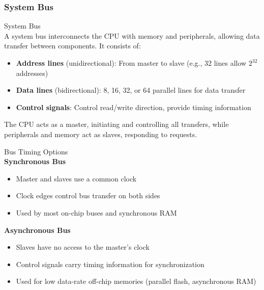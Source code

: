 \subsubsection{System Bus}

\begin{concept}{System Bus}\\
A system bus interconnects the CPU with memory and peripherals, allowing data transfer between components. It consists of:
\begin{itemize}
    \item \textbf{Address lines} (unidirectional): From master to slave (e.g., 32 lines allow $2^{32}$ addresses)
    \item \textbf{Data lines} (bidirectional): 8, 16, 32, or 64 parallel lines for data transfer
    \item \textbf{Control signals}: Control read/write direction, provide timing information
\end{itemize}
The CPU acts as a master, initiating and controlling all transfers, while peripherals and memory act as slaves, responding to requests.
\end{concept}

\begin{definition}{Bus Timing Options}\\
\textbf{Synchronous Bus}
\begin{itemize}
    \item Master and slaves use a common clock
    \item Clock edges control bus transfer on both sides
    \item Used by most on-chip buses and synchronous RAM
\end{itemize}
\textbf{Asynchronous Bus}
\begin{itemize}
    \item Slaves have no access to the master's clock
    \item Control signals carry timing information for synchronization
    \item Used for low data-rate off-chip memories (parallel flash, asynchronous RAM)
\end{itemize}
\end{definition}

